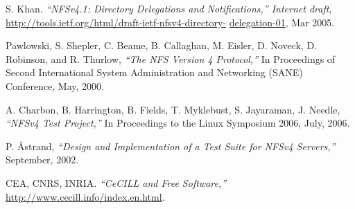 \documentclass[final]{ols}
\begin{document}
\begin{thebibliography}{99}
 S. Khan. \textit{``NFSv4.1: Directory Delegations and
    Notifications,'' Internet draft},
  \url{http://tools.ietf.org/html/draft-ietf-nfsv4-directory-}
  \url{delegation-01},
  Mar 2005.

 Pawlowski, S. Shepler, C. Beame, B. Callaghan, M.
  Eisler, D. Noveck, D. Robinson, and R. Thurlow, \textit{``The NFS
    Version 4 Protocol,''} In Proceedings of Second International
  System Administration and Networking (SANE) Conference, May, 2000.

 A. Charbon, B. Harrington, B. Fields, T.
  Myklebust, S. Jayaraman, J. Needle, \textit{``NFSv4 Test Project,''}
  In Proceedings to the Linux Symposium 2006, July, 2006.

 P. {\AA}strand, \textit{``Design and
    Implementation of a Test Suite for NFSv4 Servers,''} September, 2002.

 CEA, CNRS, INRIA. \textit{``CeCILL and Free
    Software,''} \url{http://www.cecill.info/index.en.html}.
\end{thebibliography}
\end{document}
